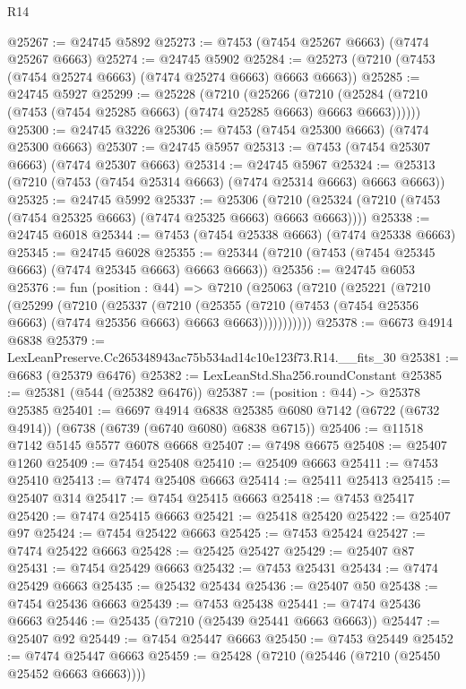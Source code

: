 \begin{lexlean}{R14}
\begin{coremodule}
@25267 := @24745 @5892
@25273 := @7453 (@7454 @25267 @6663) (@7474 @25267 @6663)
@25274 := @24745 @5902
@25284 := @25273 (@7210 (@7453 (@7454 @25274 @6663) (@7474 @25274 @6663) @6663 @6663))
@25285 := @24745 @5927
@25299 := @25228
    (@7210
      (@25266
        (@7210 (@25284 (@7210 (@7453 (@7454 @25285 @6663) (@7474 @25285 @6663) @6663 @6663))))))
@25300 := @24745 @3226
@25306 := @7453 (@7454 @25300 @6663) (@7474 @25300 @6663)
@25307 := @24745 @5957
@25313 := @7453 (@7454 @25307 @6663) (@7474 @25307 @6663)
@25314 := @24745 @5967
@25324 := @25313 (@7210 (@7453 (@7454 @25314 @6663) (@7474 @25314 @6663) @6663 @6663))
@25325 := @24745 @5992
@25337 := @25306
    (@7210 (@25324 (@7210 (@7453 (@7454 @25325 @6663) (@7474 @25325 @6663) @6663 @6663))))
@25338 := @24745 @6018
@25344 := @7453 (@7454 @25338 @6663) (@7474 @25338 @6663)
@25345 := @24745 @6028
@25355 := @25344 (@7210 (@7453 (@7454 @25345 @6663) (@7474 @25345 @6663) @6663 @6663))
@25356 := @24745 @6053
@25376 := fun (position : @44) =>
  @7210
    (@25063
      (@7210
        (@25221
          (@7210
            (@25299
              (@7210
                (@25337
                  (@7210
                    (@25355
                      (@7210 (@7453 (@7454 @25356 @6663) (@7474 @25356 @6663) @6663 @6663)))))))))))
@25378 := @6673 @4914 @6838
@25379 := LexLeanPreserve.Cc265348943ac75b534ad14c10e123f73.R14.__fits_30
@25381 := @6683 (@25379 @6476)
@25382 := LexLeanStd.Sha256.roundConstant
@25385 := @25381 (@544 (@25382 @6476))
@25387 := (position : @44) -> @25378 @25385
@25401 := @6697
    @4914
    @6838
    @25385
    @6080
    @7142
    (@6722 (@6732 @4914))
    (@6738 (@6739 (@6740 @6080) @6838 @6715))
@25406 := @11518 @7142 @5145 @5577 @6078 @6668
@25407 := @7498 @6675
@25408 := @25407 @1260
@25409 := @7454 @25408
@25410 := @25409 @6663
@25411 := @7453 @25410
@25413 := @7474 @25408 @6663
@25414 := @25411 @25413
@25415 := @25407 @314
@25417 := @7454 @25415 @6663
@25418 := @7453 @25417
@25420 := @7474 @25415 @6663
@25421 := @25418 @25420
@25422 := @25407 @97
@25424 := @7454 @25422 @6663
@25425 := @7453 @25424
@25427 := @7474 @25422 @6663
@25428 := @25425 @25427
@25429 := @25407 @87
@25431 := @7454 @25429 @6663
@25432 := @7453 @25431
@25434 := @7474 @25429 @6663
@25435 := @25432 @25434
@25436 := @25407 @50
@25438 := @7454 @25436 @6663
@25439 := @7453 @25438
@25441 := @7474 @25436 @6663
@25446 := @25435 (@7210 (@25439 @25441 @6663 @6663))
@25447 := @25407 @92
@25449 := @7454 @25447 @6663
@25450 := @7453 @25449
@25452 := @7474 @25447 @6663
@25459 := @25428 (@7210 (@25446 (@7210 (@25450 @25452 @6663 @6663))))

\end{coremodule}
\end{lexlean}
